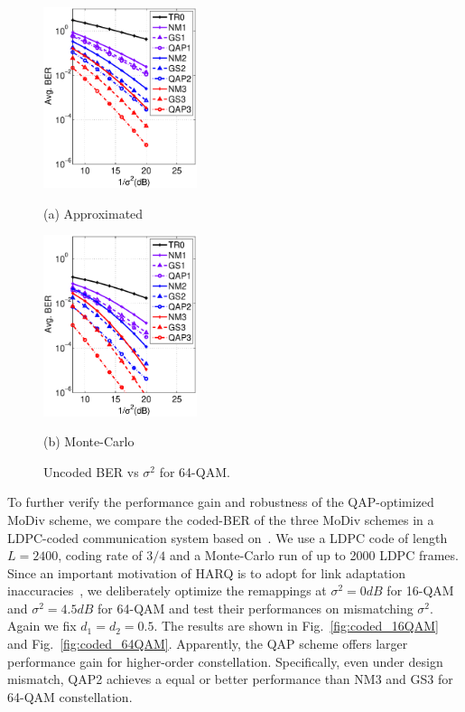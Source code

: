 \documentclass[journal]{IEEEtran}
\begin{document}
\begin{figure}[htb]
  \begin{minipage}[b]{.48\linewidth}
    \centering
    \centerline{\includegraphics[width=4.5cm]{./figs/BER_noise_power_approx_64QAM.eps}}
    \centerline{(a) Approximated}\medskip
  \end{minipage}
  \hfill
  \begin{minipage}[b]{0.48\linewidth}
    \centering
    \centerline{\includegraphics[width=4.5cm]{./figs/BER_noise_power_MonteCarlo_64QAM.eps}}
    \centerline{(b) Monte-Carlo}\medskip
  \end{minipage}
  \caption{Uncoded BER vs $\sigma^2$ for 64-QAM.}
  \label{fig:uncoded_noisepower}
\end{figure}

To further verify the performance gain and robustness of the
QAP-optimized MoDiv scheme, we compare the coded-BER of the three MoDiv schemes
in a LDPC-coded communication system based on~\cite{hochwald2003achieving}. We
use a LDPC code of length $L=2400$, coding rate of $3/4$ and a Monte-Carlo run of up to 2000 LDPC
frames. Since an important motivation of HARQ is to adopt for link adaptation
inaccuracies~\cite{cheng2006coding}, we deliberately optimize the remappings at
$\sigma^2=0dB$ for 16-QAM and $\sigma^2=4.5dB$ for 64-QAM and test their performances on
mismatching $\sigma^2$. Again we fix $d_1=d_2=0.5$. The results are shown in
Fig.~\ref{fig:coded_16QAM} and Fig.~\ref{fig:coded_64QAM}. Apparently, the QAP
scheme offers larger performance gain for higher-order constellation.
Specifically, even under design mismatch, QAP2 achieves a equal or better
performance than NM3 and GS3 for 64-QAM constellation.
\end{document}
